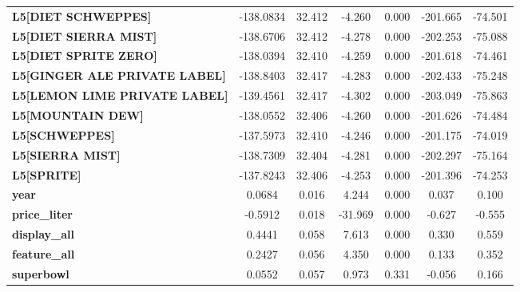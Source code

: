\begin{center}
\begin{tabular}{lcccccc}
\textbf{L5[DIET SCHWEPPES]}                &    -138.0834  &       32.412     &    -4.260  &         0.000        &     -201.665    &      -74.501     \\
\textbf{L5[DIET SIERRA MIST]}              &    -138.6706  &       32.412     &    -4.278  &         0.000        &     -202.253    &      -75.088     \\
\textbf{L5[DIET SPRITE ZERO]}              &    -138.0394  &       32.410     &    -4.259  &         0.000        &     -201.618    &      -74.461     \\
\textbf{L5[GINGER ALE PRIVATE LABEL]}      &    -138.8403  &       32.417     &    -4.283  &         0.000        &     -202.433    &      -75.248     \\
\textbf{L5[LEMON LIME PRIVATE LABEL]}      &    -139.4561  &       32.417     &    -4.302  &         0.000        &     -203.049    &      -75.863     \\
\textbf{L5[MOUNTAIN DEW]}                  &    -138.0552  &       32.406     &    -4.260  &         0.000        &     -201.626    &      -74.484     \\
\textbf{L5[SCHWEPPES]}                     &    -137.5973  &       32.410     &    -4.246  &         0.000        &     -201.175    &      -74.019     \\
\textbf{L5[SIERRA MIST]}                   &    -138.7309  &       32.404     &    -4.281  &         0.000        &     -202.297    &      -75.164     \\
\textbf{L5[SPRITE]}                        &    -137.8243  &       32.406     &    -4.253  &         0.000        &     -201.396    &      -74.253     \\
\textbf{year}                              &       0.0684  &        0.016     &     4.244  &         0.000        &        0.037    &        0.100     \\
\textbf{price\_liter}                      &      -0.5912  &        0.018     &   -31.969  &         0.000        &       -0.627    &       -0.555     \\
\textbf{display\_all}                      &       0.4441  &        0.058     &     7.613  &         0.000        &        0.330    &        0.559     \\
\textbf{feature\_all}                      &       0.2427  &        0.056     &     4.350  &         0.000        &        0.133    &        0.352     \\
\textbf{superbowl}                         &       0.0552  &        0.057     &     0.973  &         0.331        &       -0.056    &        0.166     \\

\end{tabular}
\end{center}
